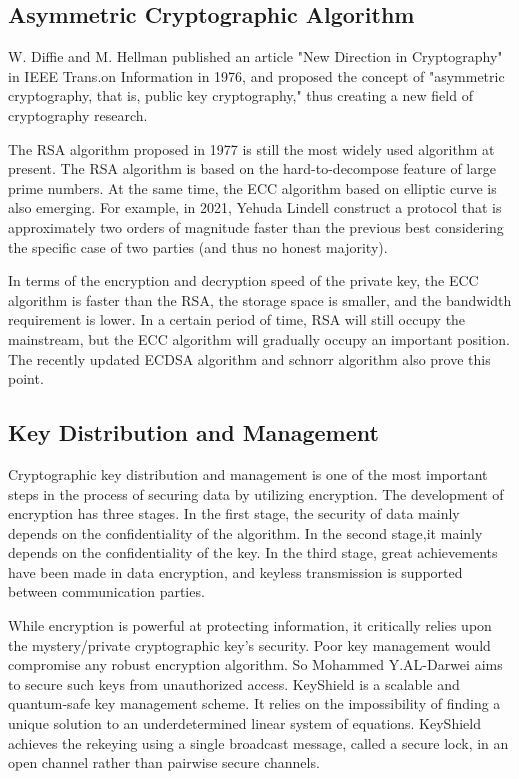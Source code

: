 \documentclass[conference]{IEEEtran}
\begin{document}
\subsection{Asymmetric Cryptographic Algorithm}
W. Diffie and M. Hellman published an article "New Direction in Cryptography" in IEEE Trans.on Information in 1976, and proposed the concept of "asymmetric cryptography, that is, public key cryptography," thus creating a new field of cryptography research.

The RSA algorithm proposed in 1977 is still the most widely used algorithm at present. The RSA algorithm is based on the hard-to-decompose feature of large prime numbers. At the same time, the ECC algorithm based on elliptic curve is also emerging. For example, in 2021, Yehuda Lindell\cite{wwx-1} construct a protocol that is approximately two orders of magnitude faster than the previous best considering the specific case of two parties (and thus no honest majority).

In terms of the encryption and decryption speed of the private key, the ECC algorithm is faster than the RSA, the storage space is smaller, and the bandwidth requirement is lower. In a certain period of time, RSA will still occupy the mainstream, but the ECC algorithm will gradually occupy an important position. The recently updated ECDSA algorithm and schnorr algorithm also prove this point.
\subsection{Key Distribution and Management}
Cryptographic key distribution and management is one of the most important steps in the process of securing data by utilizing encryption. The development of encryption has three stages. In the first stage, the security of data mainly depends on the confidentiality of the algorithm. In the second stage,it mainly depends on the confidentiality of the key. In the third stage, great achievements have been made in data encryption, and keyless transmission is supported between communication parties. 

While encryption is powerful at protecting information, it critically relies upon the mystery/private cryptographic key’s security. Poor key management would compromise any robust encryption algorithm. So Mohammed Y.AL-Darwei\cite{LMQ} aims to secure such keys from unauthorized access. KeyShield is a scalable and quantum-safe key management scheme. It relies on the impossibility of finding a unique solution to an underdetermined linear system of equations. KeyShield achieves the rekeying using a single broadcast message, called a secure lock, in an open channel rather than pairwise secure channels. 
\end{document}
